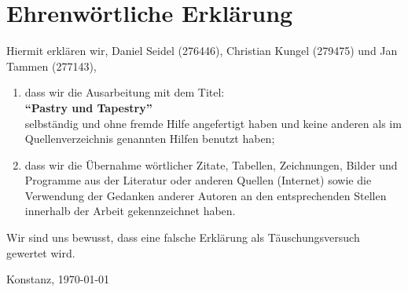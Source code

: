 \section*{Ehrenw\"{o}rtliche Erkl\"{a}rung}

Hiermit erklären wir, Daniel Seidel (276446), Christian Kungel (279475) und Jan Tammen 
(277143),

\vspace{1.0 cm}
\begin{enumerate}
  \item dass wir die Ausarbeitung mit dem Titel:\\
  
  \textbf{"`Pastry und Tapestry"'}\\
  
  selbständig und ohne fremde Hilfe angefertigt haben und keine anderen als im
  Quellenverzeichnis genannten Hilfen benutzt haben;
  
  \item dass wir die Übernahme wörtlicher Zitate, Tabellen, Zeichnungen, Bilder
  und Programme aus der Literatur oder anderen Quellen (Internet) sowie die
  Verwendung der Gedanken anderer Autoren an den entsprechenden Stellen innerhalb
  der Arbeit gekennzeichnet haben.
\end{enumerate}

\vspace{1.0 cm}
Wir sind uns bewusst, dass eine falsche Erklärung als Täuschungsversuch
gewertet wird.

\vfill Konstanz, \today